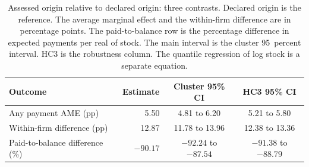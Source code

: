 \begin{table}[H]
\centering
\caption{Assessed origin relative to declared origin: three contrasts.
Declared origin is the reference.
The average marginal effect and the within-firm difference are in percentage points.
The paid-to-balance row is the percentage difference in expected payments per real of stock.
The main interval is the cluster 95~percent interval.
HC3 is the robustness column.
The quantile regression of log stock is a separate equation.}\label{tab:origin-contrasts}\label{fig:origin-contrasts}
\footnotesize
\begin{tabular}{@{}l r cc@{}}
\toprule
Outcome & Estimate & Cluster 95\% CI & HC3 95\% CI \\
\midrule
Any payment AME (pp) & 5.50 & 4.81 to 6.20 & 5.21 to 5.80 \\
Within-firm difference (pp) & 12.87 & 11.78 to 13.96 & 12.38 to 13.36 \\
Paid-to-balance difference (\%) & $-90.17$ & $-92.24$ to $-87.54$ & $-91.38$ to $-88.79$ \\
\bottomrule
\end{tabular}
\end{table}
